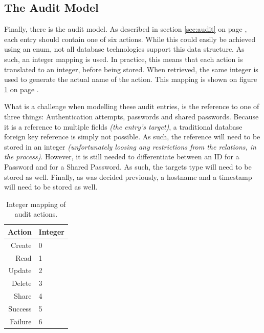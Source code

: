 		\subsection{The Audit Model}
			\label{sec:moddeling:audit}
			Finally, there is the audit model. As described in section \ref{sec:audit} on page \pageref{sec:audit}, each entry should contain one of six actions. While this could easily be achieved using an enum, not all database technologies support this data structure. As such, an integer mapping is used. In practice, this means that each action is translated to an integer, before being stored. When retrieved, the same integer is used to generate the actual name of the action. This mapping is shown on figure \ref{table:audit:actionmapping} on page \pageref{table:audit:actionmapping}.

			What is a challenge when modelling these audit entries, is the reference to one of three things: Authentication attempts, passwords and shared passwords. Because it is a reference to multiple fields \emph{(the entry's target)}, a traditional database foreign key reference is simply not possible. As such, the reference will need to be stored in an integer \emph{(unfortunately loosing any restrictions from the relations, in the process)}. However, it is still needed to differentiate between an ID for a Password and for a Shared Password. As such, the targets type will need to be stored as well. Finally, as was decided previously, a hostname and a timestamp will need to be stored as well.

			\begin{table}[h!]
				\centering
				\begin{tabular}{r | l}
					\textbf{Action} 	& \textbf{Integer} 	\\
					\hline
					Create 				& 0 				\\
					Read 				& 1 				\\
					Update 				& 2 				\\
					Delete 				& 3 				\\
					Share 				& 4 				\\
					Success 			& 5 				\\
					Failure 			& 6 				\\					
				\end{tabular}
				\caption{Integer mapping of audit actions.}
				\label{table:audit:actionmapping}
			\end{table}

